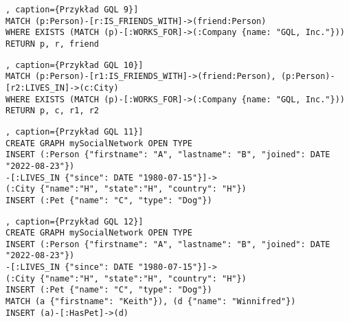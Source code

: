 \begin{lstlisting}[style=gqlStyle, label={lst:wydajnosc-przyklad-p-9}], caption={Przykład GQL 9}]
MATCH (p:Person)-[r:IS_FRIENDS_WITH]->(friend:Person)
WHERE EXISTS (MATCH (p)-[:WORKS_FOR]->(:Company {name: "GQL, Inc."}))
RETURN p, r, friend
\end{lstlisting}

\begin{lstlisting}[style=gqlStyle, label={lst:wydajnosc-przyklad-p-10}], caption={Przykład GQL 10}]
MATCH (p:Person)-[r1:IS_FRIENDS_WITH]->(friend:Person), (p:Person)-[r2:LIVES_IN]->(c:City)
WHERE EXISTS (MATCH (p)-[:WORKS_FOR]->(:Company {name: "GQL, Inc."}))
RETURN p, c, r1, r2
\end{lstlisting}

\begin{lstlisting}[style=gqlStyle, label={lst:wydajnosc-przyklad-p-11}], caption={Przykład GQL 11}]
CREATE GRAPH mySocialNetwork OPEN TYPE
INSERT (:Person {"firstname": "A", "lastname": "B", "joined": DATE "2022-08-23"})
-[:LIVES_IN {"since": DATE "1980-07-15"}]->
(:City {"name":"H", "state":"H", "country": "H"})
INSERT (:Pet {"name": "C", "type": "Dog"})
\end{lstlisting}

\begin{lstlisting}[style=gqlStyle, label={lst:wydajnosc-przyklad-p-12}], caption={Przykład GQL 12}]
CREATE GRAPH mySocialNetwork OPEN TYPE
INSERT (:Person {"firstname": "A", "lastname": "B", "joined": DATE "2022-08-23"})
-[:LIVES_IN {"since": DATE "1980-07-15"}]->
(:City {"name":"H", "state":"H", "country": "H"})
INSERT (:Pet {"name": "C", "type": "Dog"})
MATCH (a {"firstname": "Keith"}), (d {"name": "Winnifred"})
INSERT (a)-[:HasPet]->(d)
\end{lstlisting}